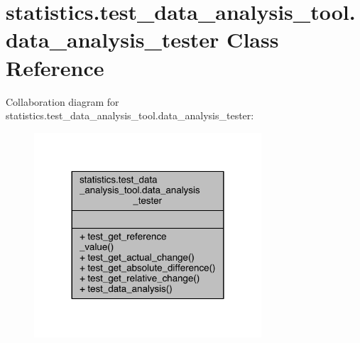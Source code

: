 \hypertarget{classstatistics_1_1test__data__analysis__tool_1_1data__analysis__tester}{}\section{statistics.\+test\+\_\+data\+\_\+analysis\+\_\+tool.\+data\+\_\+analysis\+\_\+tester Class Reference}
\label{classstatistics_1_1test__data__analysis__tool_1_1data__analysis__tester}


Collaboration diagram for statistics.\+test\+\_\+data\+\_\+analysis\+\_\+tool.\+data\+\_\+analysis\+\_\+tester\+:
\nopagebreak
\begin{figure}[H]
\begin{center}
\leavevmode
\includegraphics[width=240pt]{dc/d96/classstatistics_1_1test__data__analysis__tool_1_1data__analysis__tester__coll__graph}
\end{center}
\end{figure}
